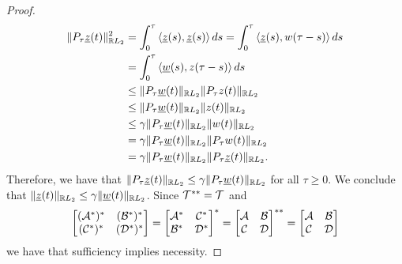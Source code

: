 \begin{proof}
    \begin{equation*}
        \begin{aligned}
            \|P_\tau \underline{z}(t)\|_{\mathbb{R} L_2}^2 &= \int_0^\tau\left\langle \underline{z}(s), \underline{z}(s) \right\rangle ds = \int_0^\tau \left\langle \underline{z}(s), w(\tau - s) \right\rangle ds\\
            &= \int_0^\tau\left\langle \underline{w}(s), z(\tau - s) \right\rangle ds \\
            &\leq \|P_\tau \underline{w}(t)\|_{\mathbb{R} L_2}\|P_\tau z(t)\|_{\mathbb{R} L_2}\\
            &\leq \| P_\tau \underline{w}(t)\|_{\mathbb{R} L_2}\|z(t)\|_{\mathbb{R} L_2} \\
            &\leq \gamma \|P_\tau\underline{w}(t)\|_{\mathbb{R} L_2}\|w(t)\|_{\mathbb{R} L_2}\\
            &=\gamma\|P_\tau \underline{w}(t)\|_{\mathbb{R} L_2}\|P_\tau w(t)\|_{\mathbb{R} L_2}\\
            &= \gamma\|P_\tau \underline{w}(t)\|_{\mathbb{R} L_2}\|P_\tau \underline{z}(t)\|_{\mathbb{R} L_2}.
        \end{aligned}
    \end{equation*}
    Therefore, we have that $\|P_\tau\underline{z}(t)\|_{\mathbb{R} L_2} \leq \gamma\|P_\tau\underline{w}(t)\|_{\mathbb{R} L_2}$ for all $\tau\geq0$. We conclude that $\|\underline{z}(t)\|_{\mathbb{R} L_2} \leq \gamma \|\underline{w}(t)\|_{\mathbb{R} L_2}$. Since $\mathcal{T}^{**} = \mathcal{T}$ and
    \begin{equation*}
        \begin{bmatrix}(\mathcal{A}^*)^* & (\mathcal{B}^*)^*\\(\mathcal{C}^*)^*&(\mathcal{D}^*)^*\end{bmatrix}=
        \begin{bmatrix}\mathcal{A}^* & \mathcal{C}^*\\\mathcal{B}^*&\mathcal{D}^*\end{bmatrix}^*= 
        \begin{bmatrix}\mathcal{A} & \mathcal{B}\\\mathcal{C}&\mathcal{D}\end{bmatrix}^{**}=\begin{bmatrix}\mathcal{A} & \mathcal{B}\\\mathcal{C}&\mathcal{D}\end{bmatrix}
    \end{equation*}
    we have that sufficiency implies necessity.
\end{proof}
